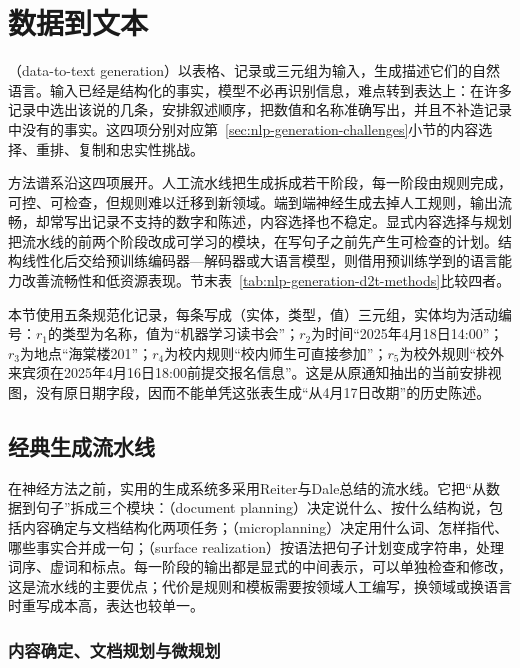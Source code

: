 \section{数据到文本}
\label{sec:nlp-generation-data-to-text}

（data-to-text generation）以表格、记录或三元组为输入，生成描述它们的自然语言。输入已经是结构化的事实，模型不必再识别信息，难点转到表达上：在许多记录中选出该说的几条，安排叙述顺序，把数值和名称准确写出，并且不补造记录中没有的事实。这四项分别对应第~\ref{sec:nlp-generation-challenges}小节的内容选择、重排、复制和忠实性挑战。

方法谱系沿这四项展开。人工流水线把生成拆成若干阶段，每一阶段由规则完成，可控、可检查，但规则难以迁移到新领域。端到端神经生成去掉人工规则，输出流畅，却常写出记录不支持的数字和陈述，内容选择也不稳定。显式内容选择与规划把流水线的前两个阶段改成可学习的模块，在写句子之前先产生可检查的计划。结构线性化后交给预训练编码器—解码器或大语言模型，则借用预训练学到的语言能力改善流畅性和低资源表现。节末表~\ref{tab:nlp-generation-d2t-methods}比较四者。

本节使用五条规范化记录，每条写成（实体，类型，值）三元组，实体均为活动编号：$r_1$的类型为名称，值为“机器学习读书会”；$r_2$为时间“2025年4月18日14:00”；$r_3$为地点“海棠楼201”；$r_4$为校内规则“校内师生可直接参加”；$r_5$为校外规则“校外来宾须在2025年4月16日18:00前提交报名信息”。这是从原通知抽出的当前安排视图，没有原日期字段，因而不能单凭这张表生成“从4月17日改期”的历史陈述。

\subsection{经典生成流水线}
\label{sec:nlp-generation-classic-pipeline}

在神经方法之前，实用的生成系统多采用Reiter与Dale总结的流水线。它把“从数据到句子”拆成三个模块：（document planning）决定说什么、按什么结构说，包括内容确定与文档结构化两项任务；（microplanning）决定用什么词、怎样指代、哪些事实合并成一句；（surface realization）按语法把句子计划变成字符串，处理词序、虚词和标点。每一阶段的输出都是显式的中间表示，可以单独检查和修改，这是流水线的主要优点；代价是规则和模板需要按领域人工编写，换领域或换语言时重写成本高，表达也较单一。

\subsubsection{内容确定、文档规划与微规划}
\label{sec:nlp-generation-nlg-pipeline-stages}

